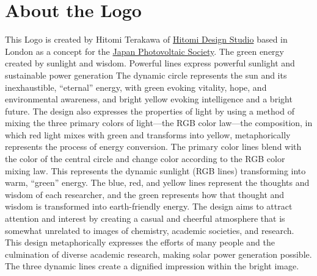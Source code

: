 \documentclass{pst-icon}
\begin{document}
\section{About the Logo}
This Logo is created by Hitomi Terakawa of \href{hitomidesigns.com}{Hitomi Design Studio} based in London as a concept for the \href{https://www.j-pvs.jp/en/}{Japan Photovoltaic Society}. The green energy created by sunlight and wisdom. Powerful lines express powerful sunlight and sustainable power generation
The dynamic circle represents the sun and its inexhaustible, ``eternal'' energy, with green evoking vitality, hope, and environmental awareness, and bright yellow evoking intelligence and a bright future.
The design also expresses the properties of light by using a method of mixing the three primary colors of light---the RGB color law---the composition, in which red light mixes with green and transforms into yellow, metaphorically represents the process of energy conversion. The primary color lines blend with the color of the central circle and change color according to the RGB color mixing law. This represents the dynamic sunlight (RGB lines) transforming into warm, ``green'' energy. The blue, red, and yellow lines represent the thoughts and wisdom of each researcher, and the green represents how that thought and wisdom is transformed into earth-friendly energy.
The design aims to attract attention and interest by creating a casual and cheerful atmosphere that is somewhat unrelated to images of chemistry, academic societies, and research.
This design metaphorically expresses the efforts of many people and the culmination of diverse academic research, making solar power generation possible. The three dynamic lines create a dignified impression within the bright image.
\end{document}
